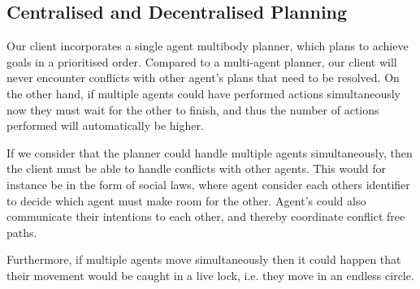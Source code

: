 \subsection{Centralised and Decentralised Planning}

Our client incorporates a single agent multibody planner, which plans to achieve goals in a prioritised order.
Compared to a multi-agent planner, our client will never encounter conflicts with other agent's plans that need to be resolved.
On the other hand, if multiple agents could have performed actions simultaneously now they must wait for the other to finish, and thus the number of actions performed will automatically be higher.

If we consider that the planner could handle multiple agents simultaneously, then the client must be able to handle conflicts with other agents.
This would for instance be in the form of social laws, where agent consider each others identifier to decide which agent must make room for the other.
Agent's could also communicate their intentions to each other, and thereby coordinate conflict free paths.

Furthermore, if multiple agents move simultaneously then it could happen that their movement would be caught in a live lock, i.e. they move in an endless circle.
